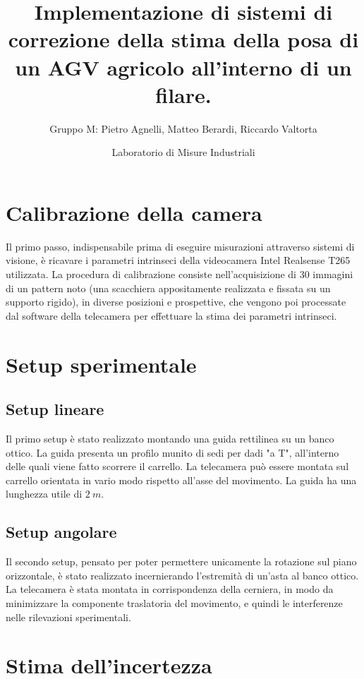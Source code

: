 \documentclass[
	a4paper, %
	10pt, %
]{LTJournalArticle}
\title{Implementazione di sistemi di correzione della stima della posa di un AGV agricolo all'interno di un filare.} %
\author{
	Gruppo M: Pietro Agnelli, Matteo Berardi, Riccardo Valtorta \hfill \fontsize{9pt}{12pt}\selectfont\\
}
\date{
         Laboratorio di Misure Industriali %
}
\begin{document}
\maketitle %


\section{Calibrazione della camera}

Il primo passo, indispensabile prima di eseguire misurazioni attraverso sistemi di visione, è ricavare i parametri intrinseci della videocamera Intel Realsense T265 utilizzata. La procedura di calibrazione consiste nell'acquisizione di $30$ immagini di un pattern noto (una scacchiera appositamente realizzata e fissata su un supporto rigido), in diverse posizioni e prospettive, che vengono poi processate dal software della telecamera per effettuare la stima dei parametri intrinseci. 

\section{Setup sperimentale}
\subsection{Setup lineare}
Il primo setup è stato realizzato montando una guida rettilinea su un banco ottico. La guida presenta un profilo munito di sedi per dadi "a T", all'interno delle quali viene fatto scorrere il carrello. La telecamera può essere montata sul carrello orientata in vario modo rispetto all'asse del movimento. La guida ha una lunghezza utile di $2\ m$.
\subsection{Setup angolare}
Il secondo setup, pensato per poter permettere unicamente la rotazione sul piano orizzontale, è stato realizzato incernierando l'estremità di un'asta al banco ottico. La telecamera è stata montata in corrispondenza della cerniera, in modo da minimizzare la componente traslatoria del movimento, e quindi le interferenze nelle rilevazioni sperimentali.

\section{Stima dell'incertezza}
\end{document}
